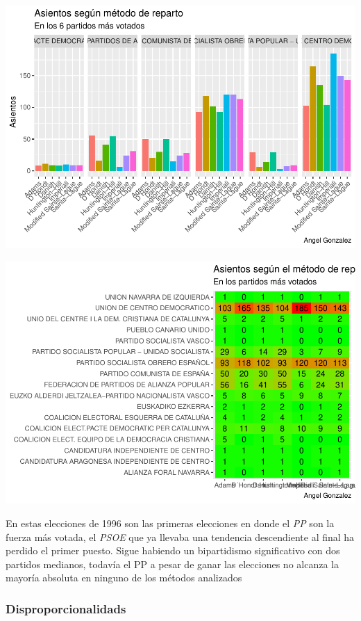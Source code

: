 \documentclass[12pt,a4paper,]{book}
\numberwithin{dummy}{section}
\theoremstyle{ocrenumbox}
\theoremstyle{blacknumex}
\theoremstyle{blacknumbox}
\theoremstyle{ocrenum}
\theoremstyle{ocrenum}
\begin{document}
\begin{center}\includegraphics[width=0.95\linewidth]{figurasR/unnamed-chunk-65-1} \end{center}

\begin{center}\includegraphics[width=0.95\linewidth]{figurasR/unnamed-chunk-65-2} \end{center}

En estas elecciones de 1996 son las primeras elecciones en donde el
\emph{PP} son la fuerza más votada, el \emph{PSOE} que ya llevaba una
tendencia descendiente al final ha perdido el primer puesto. Sigue
habiendo un bipartidismo significativo con dos partidos medianos,
todavía el PP a pesar de ganar las elecciones no alcanza la mayoría
absoluta en ninguno de los métodos analizados

\hypertarget{disproporcionalidads}{%
\subsubsection{Disproporcionalidads}\label{disproporcionalidads}}
\end{document}
